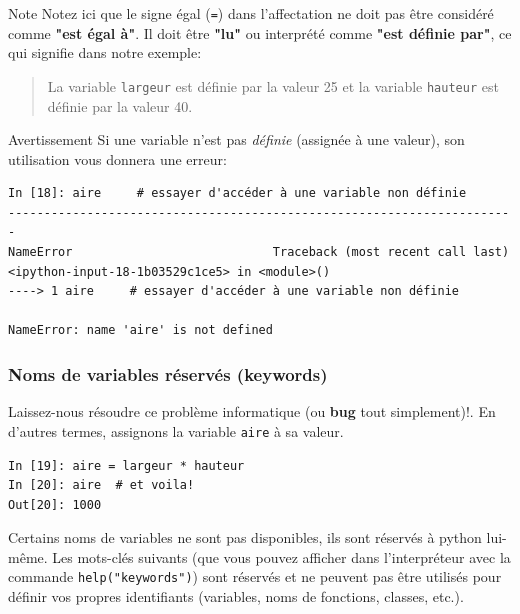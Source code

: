 \documentclass{beamer}
\begin{document}
\begin{frame}

\begin{block}{Note}
Notez ici que le signe égal (\texttt{=}) dans l'affectation ne doit pas être considéré comme \textbf{"est égal à"}. Il doit être \textbf{"lu"} ou interprété comme \textbf{"est définie par"}, ce qui signifie dans notre exemple:

\begin{quote}
La variable \texttt{largeur} est définie par la valeur 25 et la variable \texttt{hauteur} est définie par la valeur 40.
\end{quote}

\end{block}

\begin{block}{Avertissement}
Si une variable n'est pas \emph{définie} (assignée à une valeur), son utilisation vous donnera une erreur:

\begin{verbatim}
In [18]: aire     # essayer d'accéder à une variable non définie
-----------------------------------------------------------------------
NameError                            Traceback (most recent call last)
<ipython-input-18-1b03529c1ce5> in <module>()
----> 1 aire     # essayer d'accéder à une variable non définie

NameError: name 'aire' is not defined
\end{verbatim}
\end{block}
\end{frame}

\begin{frame}
\frametitle{Noms de variables réservés (keywords)}

Laissez-nous résoudre ce problème informatique (ou \textbf{bug} tout simplement)!. En d'autres termes, assignons la variable \texttt{aire} à sa valeur.

\begin{verbatim}
In [19]: aire = largeur * hauteur
In [20]: aire  # et voila!
Out[20]: 1000
\end{verbatim}


Certains noms de variables ne sont pas disponibles, ils sont réservés à python lui-même. Les mots-clés suivants (que vous pouvez afficher dans l'interpréteur avec la commande \texttt{help("keywords")}) sont réservés et ne peuvent pas être utilisés pour définir vos propres identifiants (variables, noms de fonctions, classes, etc.).
\end{frame}
\end{document}

